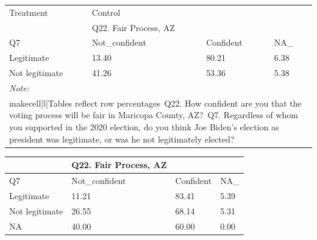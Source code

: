 \documentclass[
  11pt,
  a4paper,
]{article}
\begin{document}
\begin{table}
\centering
\centering
\begin{tabular}[t]{l|l|l|l}
\hline
\multicolumn{1}{l|}{Treatment} & \multicolumn{1}{l}{Control} \\
\cline{1-1} \cline{2-2}
 & Q22. Fair Process, AZ &  & \\
\hline
Q7 & Not\_confident & Confident & NA\_\\
\hline
Legitimate & 13.40 & 80.21 & 6.38\\
\hline
Not legitimate & 41.26 & 53.36 & 5.38\\
\hline
\multicolumn{4}{l}{\rule{0pt}{1em}\textit{Note: }}\\
\multicolumn{4}{l}{\rule{0pt}{1em}makecell[l]{Tables reflect row percentages\ Q22. How confident are you that the voting process will be fair in Maricopa County, AZ?\ Q7. Regardless of whom you supported in the 2020 election, do you think Joe Biden's election as president was legitimate, or was he not legitimately elected?}}\\
\end{tabular}
\centering
\begin{tabular}[t]{l|l|l|l}
\hline
 & Q22. Fair Process, AZ &  & \\
\hline
Q7 & Not\_confident & Confident & NA\_\\
\hline
Legitimate & 11.21 & 83.41 & 5.39\\
\hline
Not legitimate & 26.55 & 68.14 & 5.31\\
\hline
NA & 40.00 & 60.00 & 0.00\\
\hline
\end{tabular}
\end{table}
\end{document}
